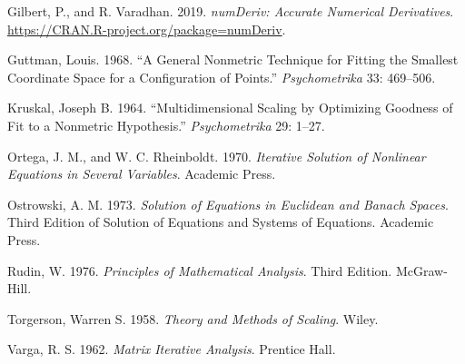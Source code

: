\documentclass[
  12pt,
]{article}
\newlength{\cslhangindent}
\newenvironment{CSLReferences}[2] %
 {\begin{list}{}{%
  \setlength{\itemindent}{0pt}
  \setlength{\leftmargin}{0pt}
  \setlength{\parsep}{0pt}
  \ifodd #1
   \setlength{\leftmargin}{\cslhangindent}
   \setlength{\itemindent}{-1\cslhangindent}
  \fi
  \setlength{\itemsep}{#2\baselineskip}}}
 {\end{list}}
\begin{document}
\begin{CSLReferences}{1}{1}
Gilbert, P., and R. Varadhan. 2019. \emph{{numDeriv: Accurate Numerical Derivatives}}. \url{https://CRAN.R-project.org/package=numDeriv}.

Guttman, Louis. 1968. {``{A General Nonmetric Technique for Fitting the Smallest Coordinate Space for a Configuration of Points}.''} \emph{Psychometrika} 33: 469--506.

Kruskal, Joseph B. 1964. {``{Multidimensional Scaling by Optimizing Goodness of Fit to a Nonmetric Hypothesis}.''} \emph{Psychometrika} 29: 1--27.

Ortega, J. M., and W. C. Rheinboldt. 1970. \emph{{Iterative Solution of Nonlinear Equations in Several Variables}}. Academic Press.

Ostrowski, A. M. 1973. \emph{Solution of Equations in Euclidean and Banach Spaces}. Third Edition of Solution of Equations and Systems of Equations. Academic Press.

Rudin, W. 1976. \emph{Principles of Mathematical Analysis}. Third Edition. McGraw-Hill.

Torgerson, Warren S. 1958. \emph{{Theory and Methods of Scaling}}. Wiley.

Varga, R. S. 1962. \emph{{Matrix Iterative Analysis}}. Prentice Hall.

\end{CSLReferences}
\end{document}

